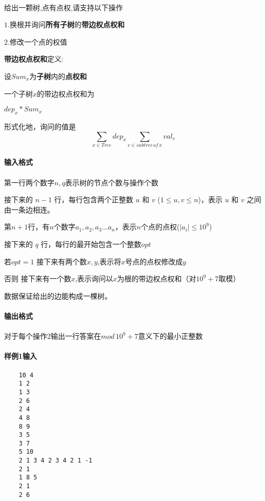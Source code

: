 \documentclass[UTF8]{ctexart}
\begin{document}
\paragraph{}
给出一颗树,点有点权,请支持以下操作

$1.$换根并询问\textbf{所有子树}的\textbf{带边权点权和}

$2.$修改一个点的权值

\textbf{带边权点权和}定义:

设$Sum_x$为\textbf{子树}内的\textbf{点权和}

一个子树$x$的带边权点权和为

$dep_x*Sum_x$

形式化地，询问的值是
$$
    \sum\limits_{x\in Tree} dep_x\sum\limits_{v\in subtree\, of\,x}{val_v}
$$

\paragraph{输入格式}
\paragraph{}
第一行两个数字$n,q$表示树的节点个数与操作个数

接下来的 $n-1$ 行，每行包含两个正整数 $u$ 和 $v$ ($1\le u,v\le n$)，表示 $u$ 和 $v$ 之间由一条边相连。

第$n+1$行，有$n$个数字$a_1,a_2,a_3\ldots a_n$，表示$n$个点的点权($|a_i|\leq 10^9$)

接下来的 $q$ 行，每行的最开始包含一个整数$opt$

若$opt=1$ 接下来有两个数$x,y$,表示将$x$号点的点权修改成$y$

否则 接下来有一个数$x$,表示询问以$x$为根的带边权点权和（对$10^9+7$取模）

数据保证给出的边能构成一棵树。

\paragraph{输出格式}
\paragraph{}对于每个操作2输出一行答案在$mod$$\,{10^9+7}$意义下的最小正整数
\paragraph{样例1输入}
\begin{lstlisting}
    10 4
    1 2
    1 3
    2 6
    2 4
    4 8
    8 9
    3 5
    3 7
    5 10
    2 1 3 4 2 3 4 2 1 -1
    2 1
    1 8 5
    2 1
    2 6
\end{lstlisting}
\end{document}
